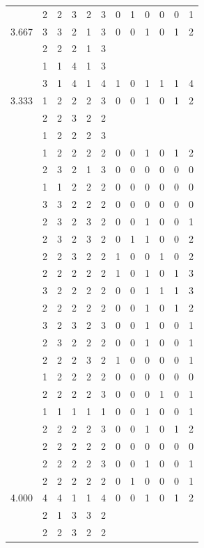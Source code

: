 \documentclass[]{msu-thesis}
\theoremstyle{definition}
\theoremstyle{definition}
\theoremstyle{definition}
\theoremstyle{remark}
\begin{document}
\begin{table}
{\begin{tabular}[t]{rrrrrrrrrrrr}
 & 2 & 2 & 3 & 2 & 3 & 0 & 1 & 0 & 0 & 0 & 1\\
3.667 & 3 & 3 & 2 & 1 & 3 & 0 & 0 & 1 & 0 & 1 & 2\\
 & 2 & 2 & 2 & 1 & 3 &  &  &  &  &  & \\
 & 1 & 1 & 4 & 1 & 3 &  &  &  &  &  & \\
 & 3 & 1 & 4 & 1 & 4 & 1 & 0 & 1 & 1 & 1 & 4\\
3.333 & 1 & 2 & 2 & 2 & 3 & 0 & 0 & 1 & 0 & 1 & 2\\
 & 2 & 2 & 3 & 2 & 2 &  &  &  &  &  & \\
 & 1 & 2 & 2 & 2 & 3 &  &  &  &  &  & \\
 & 1 & 2 & 2 & 2 & 2 & 0 & 0 & 1 & 0 & 1 & 2\\
 & 2 & 3 & 2 & 1 & 3 & 0 & 0 & 0 & 0 & 0 & 0\\
 & 1 & 1 & 2 & 2 & 2 & 0 & 0 & 0 & 0 & 0 & 0\\
 & 3 & 3 & 2 & 2 & 2 & 0 & 0 & 0 & 0 & 0 & 0\\
 & 2 & 3 & 2 & 3 & 2 & 0 & 0 & 1 & 0 & 0 & 1\\
 & 2 & 3 & 2 & 3 & 2 & 0 & 1 & 1 & 0 & 0 & 2\\
 & 2 & 2 & 3 & 2 & 2 & 1 & 0 & 0 & 1 & 0 & 2\\
 & 2 & 2 & 2 & 2 & 2 & 1 & 0 & 1 & 0 & 1 & 3\\
 & 3 & 2 & 2 & 2 & 2 & 0 & 0 & 1 & 1 & 1 & 3\\
 & 2 & 2 & 2 & 2 & 2 & 0 & 0 & 1 & 0 & 1 & 2\\
 & 3 & 2 & 3 & 2 & 3 & 0 & 0 & 1 & 0 & 0 & 1\\
 & 2 & 3 & 2 & 2 & 2 & 0 & 0 & 1 & 0 & 0 & 1\\
 & 2 & 2 & 2 & 3 & 2 & 1 & 0 & 0 & 0 & 0 & 1\\
 & 1 & 2 & 2 & 2 & 2 & 0 & 0 & 0 & 0 & 0 & 0\\
 & 2 & 2 & 2 & 2 & 3 & 0 & 0 & 0 & 1 & 0 & 1\\
 & 1 & 1 & 1 & 1 & 1 & 0 & 0 & 1 & 0 & 0 & 1\\
 & 2 & 2 & 2 & 2 & 3 & 0 & 0 & 1 & 0 & 1 & 2\\
 & 2 & 2 & 2 & 2 & 2 & 0 & 0 & 0 & 0 & 0 & 0\\
 & 2 & 2 & 2 & 2 & 3 & 0 & 0 & 1 & 0 & 0 & 1\\
 & 2 & 2 & 2 & 2 & 2 & 0 & 1 & 0 & 0 & 0 & 1\\
4.000 & 4 & 4 & 1 & 1 & 4 & 0 & 0 & 1 & 0 & 1 & 2\\
 & 2 & 1 & 3 & 3 & 2 &  &  &  &  &  & \\
 & 2 & 2 & 3 & 2 & 2 &  &  &  &  &  & \\

\end{tabular}}
\end{table}
\end{document}
